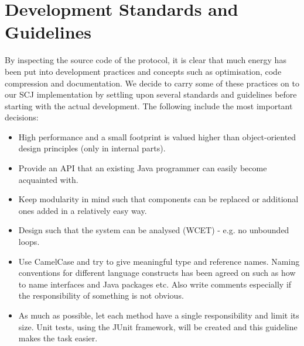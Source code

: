 \section{Development Standards and Guidelines}
By inspecting the source code of the protocol, it is clear that much energy has been put into development practices and concepts such as optimisation, code compression and documentation. We decide to carry some of these practices on to our SCJ implementation by settling upon several standards and guidelines before starting with the actual development. The following include the most important decisions:

\begin{itemize}
	\item High performance and a small footprint is valued higher than object-oriented design principles (only in internal parts).
	\item Provide an API that an existing Java programmer can easily become acquainted with.
	\item Keep modularity in mind such that components can be replaced or additional ones added in a relatively easy way. 
	\item Design such that the system can be analysed (WCET) - e.g. no unbounded loops.
	\item Use CamelCase and try to give meaningful type and reference names. Naming conventions for different language constructs has been agreed on such as how to name interfaces and Java packages etc. Also write comments especially if the responsibility of something is not obvious.
	\item As much as possible, let each method have a single responsibility and limit its size. Unit tests, using the JUnit framework, will be created and this guideline makes the task easier.
\end{itemize}